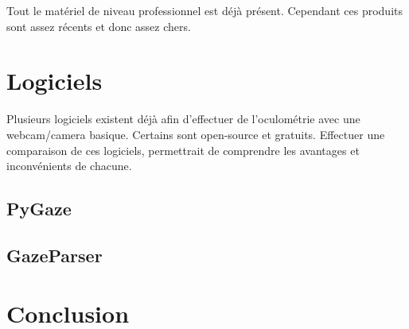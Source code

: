 \documentclass[12pt]{article}
\begin{document}
\bigskip
Tout le matériel de niveau professionnel est déjà présent. Cependant ces produits sont assez récents et donc assez chers.


\section{Logiciels}

Plusieurs logiciels existent déjà afin d'effectuer de l'oculométrie avec une
webcam/camera basique. Certains sont open-source et gratuits. Effectuer une
comparaison de ces logiciels, permettrait de comprendre les avantages et
inconvénients de chacune.

\subsection{PyGaze}

\subsection{GazeParser}


\section{Conclusion}


\pagebreak


\end{document}
